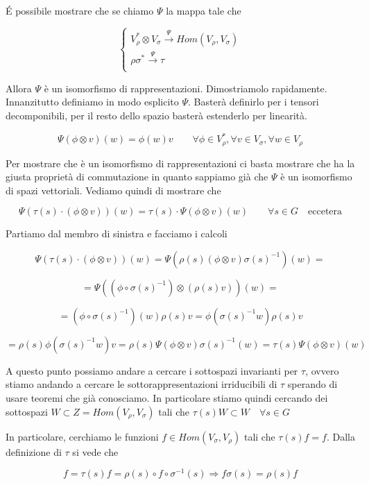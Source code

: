 \documentclass[11pt]{article}
\theoremstyle{plain}
\theoremstyle{definition}
\theoremstyle{remark}
\begin{document}
\'E possibile mostrare che se chiamo $\Psi$ la mappa tale che

\[
\begin{cases}
V_\rho^* \otimes V_\sigma \xrightarrow{\Psi} Hom(V_\rho, V_\sigma)\\
\rho\sigma^* \xrightarrow{\Psi} \tau \\
\end{cases}
\]

Allora $\Psi$ è un isomorfismo di rappresentazioni. Dimostriamolo rapidamente. Innanzitutto definiamo in modo esplicito $\Psi$. Basterà definirlo per i tensori decomponibili, per il resto dello spazio basterà estenderlo per linearità.

\[ \Psi(\phi \otimes v ) (w) = \phi(w) v \qquad \forall \phi \in V_\rho^*, \forall v \in V_\sigma, \forall w \in V_\rho\]

Per mostrare che è un isomorfismo di rappresentazioni ci basta mostrare che ha la giusta proprietà di commutazione in quanto sappiamo già che $\Psi$ è un isomorfismo di spazi vettoriali. Vediamo quindi di mostrare che 

\[\Psi(\tau(s)\cdot (\phi \otimes v))(w) = \tau(s) \cdot \Psi(\phi \otimes v)(w) \qquad \forall s \in G \quad \text{eccetera} \]


Partiamo dal membro di sinistra e facciamo i calcoli


\[\Psi(\tau(s)\cdot (\phi \otimes v))(w) = \Psi\left( \rho(s) (\phi \otimes v ) \sigma(s)^{-1}  \right)(w)  = \]

\[= \Psi((\phi \circ \sigma(s)^{-1})\otimes (\rho(s) v) )(w) =  \]

\[ = (\phi \circ \sigma(s)^{-1}) (w) \rho(s) v = \phi(\sigma(s)^{-1} w) \rho(s) v\]

\[ = \rho(s)\phi(\sigma(s)^{-1} w) v = \rho(s) \Psi(\phi \otimes v) \sigma(s)^{-1} (w) = \tau(s) \Psi (\phi \otimes v)(w)\]


A questo punto possiamo andare a cercare i sottospazi invarianti per $\tau$, ovvero stiamo andando a cercare le sottorappresentazioni irriducibili di $\tau$ sperando di usare teoremi che già conosciamo. In particolare stiamo quindi cercando dei sottospazi $W \subset Z = Hom(V_\rho, V_\sigma)$ tali che $\tau(s) W \subset W \quad \forall s \in G$ 

In particolare, cerchiamo le funzioni $f \in Hom(V_\sigma, V_\rho)$ tali che $\tau(s) f = f$. Dalla definizione di $\tau$ si vede che

\[f = \tau(s) f =  \rho(s) \circ f \circ \sigma^{-1}(s) \Rightarrow  f \sigma(s)= \rho(s) f\] 
\end{document}

